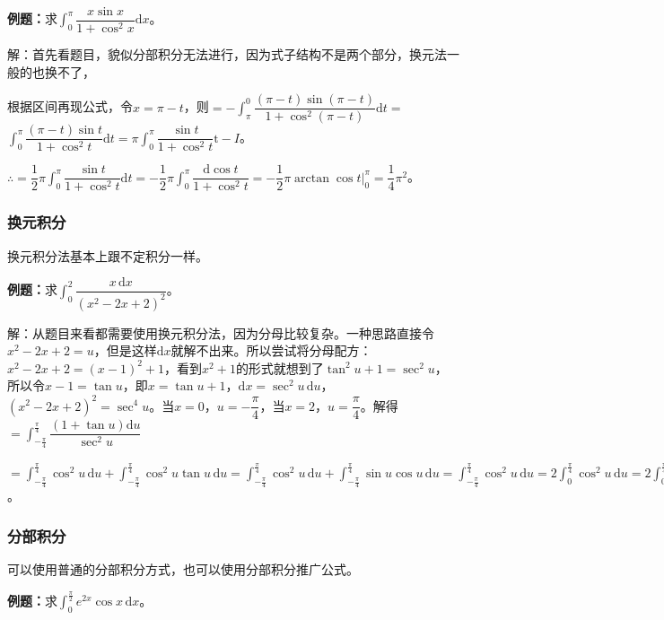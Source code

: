 \documentclass[UTF8, 12pt]{ctexart}
\begin{document}
\textbf{例题：}求$\displaystyle{\int_0^\pi}\dfrac{x\sin x}{1+\cos^2x}\textrm{d}x$。

解：首先看题目，貌似分部积分无法进行，因为式子结构不是两个部分，换元法一般的也换不了，

根据区间再现公式，令$x=\pi-t$，则$=-\displaystyle{\int_\pi^0\dfrac{(\pi-t)\sin(\pi-t)}{1+\cos^2(\pi-t)}\textrm{d}t}=$\\$\displaystyle{\int_0^\pi\dfrac{(\pi-t)\sin t}{1+\cos^2t}\textrm{d}t}=\pi\displaystyle{\int_0^\pi\dfrac{\sin t}{1+\cos^2t}\textrm{t}-I}$。

$\therefore=\dfrac{1}{2}\pi\displaystyle{\int_0^\pi\dfrac{\sin t}{1+\cos^2t}\textrm{d}t}=-\dfrac{1}{2}\pi\int_0^\pi\dfrac{\textrm{d}\cos t}{1+\cos^2t}=-\dfrac{1}{2}\pi\arctan\cos t\bigg|_0^\pi=\dfrac{1}{4}\pi^2$。

\subsubsection{换元积分}

换元积分法基本上跟不定积分一样。

\textbf{例题：}求$\displaystyle{\int_0^2\dfrac{x\,\textrm{d}x}{(x^2-2x+2)^2}}$。\medskip

解：从题目来看都需要使用换元积分法，因为分母比较复杂。一种思路直接令$x^2-2x+2=u$，但是这样$\textrm{d}x$就解不出来。所以尝试将分母配方：$x^2-2x+2=(x-1)^2+1$，看到$x^2+1$的形式就想到了$\tan^2u+1=\sec^2u$，所以令$x-1=\tan u$，即$x=\tan u+1$，$\textrm{d}x=\sec^2u\,\textrm{d}u$，$(x^2-2x+2)^2=\sec^4u$。当$x=0$，$u=-\dfrac{\pi}{4}$，当$x=2$，$u=\dfrac{\pi}{4}$。解得$=\displaystyle{\int_{-\frac{\pi}{4}}^\frac{\pi}{4}\dfrac{(1+\tan u)\textrm{d}u}{\sec^2u}}$

$=\int_{-\frac{\pi}{4}}^\frac{\pi}{4}\cos^2u\,\textrm{d}u+\int_{-\frac{\pi}{4}}^\frac{\pi}{4}\cos^2u\tan u\,\textrm{d}u=\int_{-\frac{\pi}{4}}^\frac{\pi}{4}\cos^2u\,\textrm{d}u+\int_{-\frac{\pi}{4}}^\frac{\pi}{4}\sin u\cos u\,\textrm{d}u=\int_{-\frac{\pi}{4}}^\frac{\pi}{4}\cos^2u\,\textrm{d}u=2\int_0^\frac{\pi}{4}\cos^2u\,\textrm{d}u=2\int_0^\frac{\pi}{4}(1+\cos2u)\,\textrm{d}u=\dfrac{\pi}{4}+\dfrac{1}{2}$。

\subsubsection{分部积分}

可以使用普通的分部积分方式，也可以使用分部积分推广公式。

\textbf{例题：}求$\int_0^\frac{\pi}{2}e^{2x}\cos x\,\textrm{d}x$。
\end{document}
